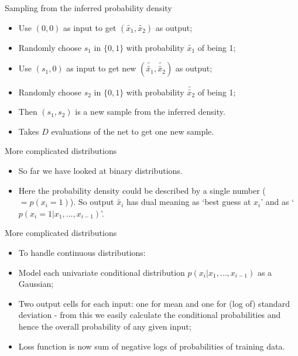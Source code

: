 \documentclass[usenames,dvipsnames]{beamer}
\begin{document}
\begin{frame}{Sampling from the inferred probability density}
    \begin{itemize}
      \item{Use $(0, 0)$ as input to get $(\tilde{x_1}, \tilde{x_2})$ as output;}
	\item{Randomly choose $s_1$ in $\{0, 1\}$ with probability $\tilde{x_1}$ of being 1;}
	\item{Use $(s_1, 0)$ as input to get new $(\tilde{\tilde{x_1}}, \tilde{\tilde{x_2}})$ as output;}
	\item{Randomly choose $s_2$ in $\{0, 1\}$ with probability $\tilde{\tilde{x_2}}$ of being 1;}
	\item{Then $(s_1, s_2)$ is a new sample from the inferred density.}
	\item{Takes $D$ evaluations of the net to get one new sample.}
    \end{itemize}
\end{frame}


\begin{frame}{More complicated distributions}
    \begin{itemize}
      \item{So far we have looked at binary distributions.}
	\item{Here the probability density could be described by a single number ($= p(x_i = 1)$). So output $\tilde{x_i}$ has dual meaning as `best guess at $x_i$' and as `$p(x_i = 1 | x_1, \dots, x_{i-1})$'.}
    \end{itemize}
\end{frame}

\begin{frame}{More complicated distributions}
    \begin{itemize}
      \item{To handle continuous distributions:}
	\item{Model each univariate conditional distribution $p(x_i | x_1, \dots, x_{i-1})$ as a Gaussian;}
	\item{Two output cells for each input: one for mean and one for (log of) standard deviation - from this we easily calculate the conditional probabilities and hence the overall probability of any given input;}
	\item{Loss function is now sum of negative logs of probabilities of training data.}
    \end{itemize}
\end{frame}
\end{document}
